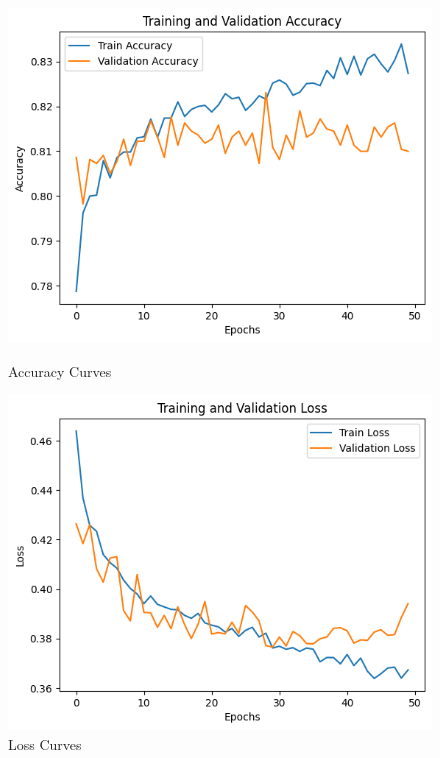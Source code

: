 \documentclass[a4paper,11pt]{article}
\begin{document}
\begin{figure}[h!]
    \centering
    \begin{minipage}{0.45\textwidth}
        \centering
        \includegraphics[width=\textwidth]{nn_acc.png}
        \caption{Accuracy Curves}
        \label{fig:ac}
    \end{minipage}
    \hfill
    \begin{minipage}{0.45\textwidth}
        \centering
        \includegraphics[width=\textwidth]{nn_loss.png}
        \caption{Loss Curves}
        \label{fig:lc}
    \end{minipage}
\end{figure}
\end{document}
